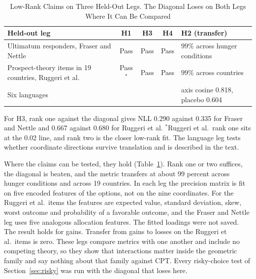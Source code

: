 \documentclass[journal]{IEEEtran}
\begin{document}
\begin{table}[!t]
\renewcommand{\arraystretch}{1.2}
\caption{Low-Rank Claims on Three Held-Out Legs. The Diagonal Loses on Both Legs Where It Can Be Compared}
\label{tab:lowrank}
\centering
\begin{tabular}{@{}p{} c c c p{}@{}}
\toprule
\textbf{Held-out leg} & \textbf{H1} & \textbf{H3} & \textbf{H4} & \textbf{H2 (transfer)} \\
\midrule
Ultimatum responders, Fraser and Nettle~\cite{fraser2020} & Pass & Pass & Pass & $99\%$ across hunger conditions \\
Prospect-theory items in 19 countries, Ruggeri et al.~\cite{ruggeri2020} & Pass$^{*}$ & Pass & Pass & $99\%$ across countries \\
Six languages &  &  &  & axis cosine 0.818, placebo 0.604 \\
\bottomrule
\end{tabular}
\begin{flushleft}
\footnotesize{For H3, rank one against the diagonal gives NLL 0.290 against 0.335 for Fraser and Nettle and 0.667 against 0.680 for Ruggeri et al. $^{*}$Ruggeri et al.\ rank one sits at the 0.02 line, and rank two is the closer low-rank fit. The language leg tests whether coordinate directions survive translation and is described in the text.}
\end{flushleft}
\end{table}

Where the claims can be tested, they hold (Table~\ref{tab:lowrank}).
Rank one or two suffices, the diagonal is beaten, and the metric transfers at about 99 percent across hunger conditions and across 19 countries.
In each leg the precision matrix is fit on five encoded features of the options, not on the nine coordinates.
For the Ruggeri et al.\ items the features are expected value, standard deviation, skew, worst outcome and probability of a favorable outcome, and the Fraser and Nettle leg uses five analogous allocation features.
The fitted loadings were not saved.
The result holds for gains.
Transfer from gains to losses on the Ruggeri et al.\ items is zero.
These legs compare metrics with one another and include no competing theory, so they show that interactions matter inside the geometric family and say nothing about that family against CPT.
Every risky-choice test of Section~\ref{sec:risky} was run with the diagonal that loses here.
\end{document}
